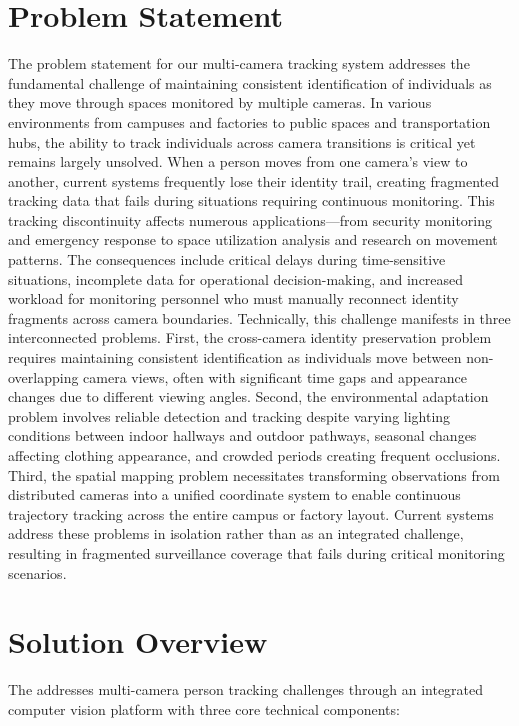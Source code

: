 \section{Problem Statement}
\label{section:problem-statement}
The problem statement for our multi-camera tracking system addresses the fundamental challenge of maintaining consistent identification of individuals as they move through spaces monitored by multiple cameras. In various environments from campuses and factories to public spaces and transportation hubs, the ability to track individuals across camera transitions is critical yet remains largely unsolved. When a person moves from one camera's view to another, current systems frequently lose their identity trail, creating fragmented tracking data that fails during situations requiring continuous monitoring. This tracking discontinuity affects numerous applications—from security monitoring and emergency response to space utilization analysis and research on movement patterns. The consequences include critical delays during time-sensitive situations, incomplete data for operational decision-making, and increased workload for monitoring personnel who must manually reconnect identity fragments across camera boundaries.
Technically, this challenge manifests in three interconnected problems. First, the cross-camera identity preservation problem requires maintaining consistent identification as individuals move between non-overlapping camera views, often with significant time gaps and appearance changes due to different viewing angles. Second, the environmental adaptation problem involves reliable detection and tracking despite varying lighting conditions between indoor hallways and outdoor pathways, seasonal changes affecting clothing appearance, and crowded periods creating frequent occlusions. Third, the spatial mapping problem necessitates transforming observations from distributed cameras into a unified coordinate system to enable continuous trajectory tracking across the entire campus or factory layout. Current systems address these problems in isolation rather than as an integrated challenge, resulting in fragmented surveillance coverage that fails during critical monitoring scenarios.

\section{Solution Overview}
\label{section:solution-overview}

The \usevar{\srsTitle} addresses multi-camera person tracking challenges through an integrated computer vision platform with three core technical components:

